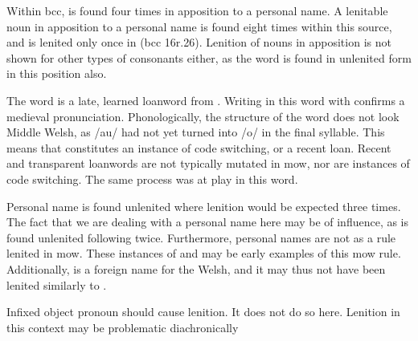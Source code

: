 Within \gls{bcc},  is found four times in apposition to a personal name.
A lenitable noun in apposition to a personal name is found eight times within this source, and is lenited only once in  (\gls{bcc} 16r.26).
Lenition of nouns in apposition is not shown for other types of consonants either, as the word  is found in unlenited form in this position also.

The word  is a late, learned loanword from .
Writing  in this word with  confirms a medieval pronunciation.
Phonologically, the structure of the word does not look Middle Welsh, as /au/ had not yet turned into /o/ in the final syllable.
This means that  constitutes an instance of code switching, or a recent loan.
Recent and transparent loanwords are not typically mutated in \gls{mow}, nor are instances of code switching.
The same process was at play in this word.

Personal name  is found unlenited where lenition would be expected three times.
The fact that we are dealing with a personal name here may be of influence, as  is found unlenited following  twice.
Furthermore, personal names are not as a rule lenited in \gls{mow}.
These instances of  and  may be early examples of this \gls{mow} rule.
Additionally,  is a foreign name for the Welsh, and it may thus not have been lenited similarly to .

Infixed object pronoun  should cause lenition. It does not do so here.
Lenition in this context may be problematic diachronically 

